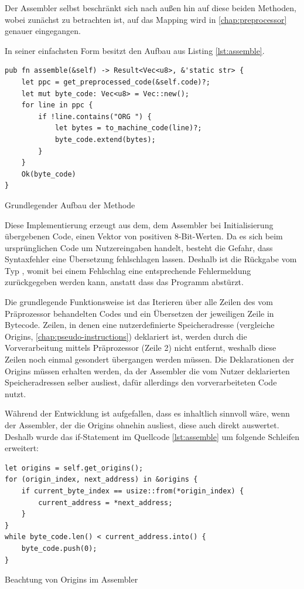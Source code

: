 Der Assembler selbst beschränkt sich nach außen hin auf diese beiden Methoden, wobei zunächst  zu betrachten ist, auf das Mapping wird in \ref{chap:preprocessor} genauer eingegangen.

In seiner einfachsten Form besitzt  den Aufbau aus Listing \ref{lst:assemble}.

\begin{listing}[ht]
\begin{verbatim}
pub fn assemble(&self) -> Result<Vec<u8>, &'static str> {
	let ppc = get_preprocessed_code(&self.code)?;
	let mut byte_code: Vec<u8> = Vec::new();
    for line in ppc {
        if !line.contains("ORG ") {
	        let bytes = to_machine_code(line)?;
            byte_code.extend(bytes);
        }
    }
    Ok(byte_code)
}
\end{verbatim}
\label{lst:assemble}
\caption{Grundlegender Aufbau der Methode }
\end{listing}

Diese Implementierung erzeugt aus dem, dem Assembler bei Initialisierung übergebenen Code, einen Vektor von positiven 8-Bit-Werten. Da es sich beim ursprünglichen Code um Nutzereingaben handelt, besteht die Gefahr, dass Syntaxfehler eine Übersetzung fehlschlagen lassen. Deshalb ist die Rückgabe vom Typ , womit bei einem Fehlschlag eine entsprechende Fehlermeldung zurückgegeben werden kann, anstatt dass das Programm abstürzt.

Die grundlegende Funktionsweise ist das Iterieren über alle Zeilen des vom Präprozessor behandelten Codes und ein Übersetzen der jeweiligen Zeile in Bytecode. Zeilen, in denen eine nutzerdefinierte Speicheradresse (vergleiche Origins, \ref{chap:pseudo-instructions}) deklariert ist, werden durch die Vorverarbeitung mittels Präprozessor (Zeile 2) nicht entfernt, weshalb diese Zeilen noch einmal gesondert übergangen werden müssen. Die Deklarationen der Origins müssen erhalten werden, da der Assembler die vom Nutzer deklarierten Speicheradressen selber ausliest, dafür allerdings den vorverarbeiteten Code nutzt.

Während der Entwicklung ist aufgefallen, dass es inhaltlich sinnvoll wäre, wenn der Assembler, der die Origins ohnehin ausliest, diese auch direkt auswertet. Deshalb wurde das if-Statement im Quellcode \ref{lst:assemble} um folgende Schleifen erweitert:

\begin{listing}[th]
\begin{verbatim}
let origins = self.get_origins();
for (origin_index, next_address) in &origins {
	if current_byte_index == usize::from(*origin_index) {
        current_address = *next_address;
    }
}
while byte_code.len() < current_address.into() {
    byte_code.push(0);
}
\end{verbatim}
\caption{Beachtung von Origins im Assembler}
\end{listing}

